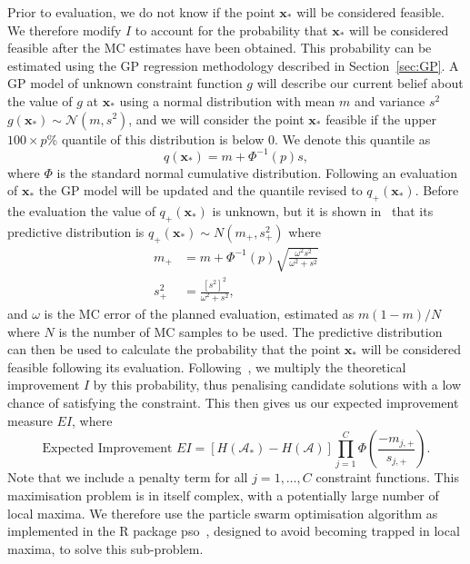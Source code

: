\documentclass{article} %
\begin{document}
Prior to evaluation, we do not know if the point $\mathbf{x}_{*}$ will be considered feasible. We therefore modify $I$ to account for the probability that $\mathbf{x}_{*}$ will be considered feasible after the MC estimates have been obtained. This probability can be estimated using the GP regression methodology described in Section~\ref{sec:GP}. A GP model of unknown constraint function $g$ will describe our current belief about the value of $g$ at $\mathbf{x}_{*}$ using a normal distribution with mean $m$ and variance $s^2$ $g(\mathbf{x}_{*}) \sim \mathcal{N}(m, s^{2})$, and we will consider the point $\mathbf{x}_{*}$ feasible if the upper $100 \times p$\% quantile of this distribution is below 0. We denote this quantile as
\begin{equation}\label{eqn:quant}
q(\mathbf{x}_{*}) = m + \Phi^{-1}(p)s,
\end{equation}
where $\Phi$ is the standard normal cumulative distribution. Following an evaluation of $\mathbf{x}_{*}$ the GP model will be updated and the quantile revised to $q_{+}(\mathbf{x}_{*})$. Before the evaluation the value of $q_{+}(\mathbf{x}_{*})$ is unknown, but it is shown in~\cite{Picheny2014} that its predictive distribution is $q_{+}(\mathbf{x}_{*}) \sim N(m_{+}, s_{+}^{2})$ where
\begin{align}
m_{+} &= m + \Phi^{-1}(p)\sqrt{\frac{\omega^{2}s^{2}}{\omega^{2} + s^{2}}} \\
s_{+}^{2} &= \frac{[s^{2}]^{2}}{\omega^{2} + s^{2}},
\end{align}
and $\omega$ is the MC error of the planned evaluation, estimated as $m(1-m)/N$ where $N$ is the number of MC samples to be used. The predictive distribution can then be used to calculate the probability that the point $\mathbf{x}_{*}$ will be considered feasible following its evaluation. Following~\cite{Sasena2002}, we multiply the theoretical improvement $I$ by this probability, thus penalising candidate solutions with a low chance of satisfying the constraint. This then gives us our expected improvement measure $EI$, where
\begin{equation}
\text{Expected Improvement } EI = [H(\mathcal{A}_{*}) - H(\mathcal{A})] \prod_{j=1}^{C} \Phi\left(\frac{-m_{j,+}}{s_{j,+}}\right).
\end{equation}
Note that we include a penalty term for all $j = 1, \ldots , C$ constraint functions. This maximisation problem is in itself complex, with a potentially large number of local maxima. We therefore use the particle swarm optimisation algorithm as implemented in the R package pso~\cite{Bendtsen2012}, designed to avoid becoming trapped in local maxima, to solve this sub-problem.
\end{document}
